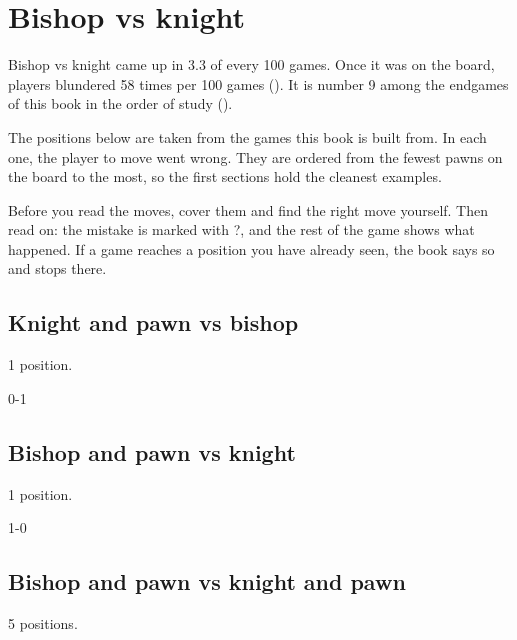 \chapter{Bishop vs knight}\label{ch:bishop-vs-knight}
Bishop vs knight came up in 3.3 of every 100 games. Once it was on the board, players blundered 58 times per 100 games (). It is number 9 among the endgames of this book in the order of study ().

The positions below are taken from the games this book is built from. In each one, the player to move went wrong. They are ordered from the fewest pawns on the board to the most, so the first sections hold the cleanest examples.

Before you read the moves, cover them and find the right move yourself. Then read on: the mistake is marked with ?, and the rest of the game shows what happened. If a game reaches a position you have already seen, the book says so and stops there.


\section{Knight and pawn vs bishop}
1 position.


0-1\par
\section{Bishop and pawn vs knight}
1 position.


1-0\par
\section{Bishop and pawn vs knight and pawn}
5 positions.

